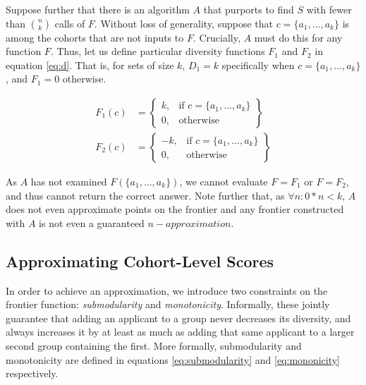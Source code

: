Suppose further that there is an algorithm $A$ that purports to find $S$ with fewer than $n \choose k$ calls of $F$. Without loss of generality, suppose that $c = \{ a_1, ..., a_k \}$ is among the cohorts that are not inputs to $F$. Crucially, $A$ must do this for any function $F$. Thus, let us define particular diversity functions $F_1$ and $F_2$ in equation \ref{eq:d}. That is, for sets of size $k$, $D_1 = k$ specifically when $c = \{ a_1, ..., a_k \}$, and $F_1 = 0$ otherwise.

\begin{equation}
    \label{eq:d}
    \begin{split}
        F_1(c) &=
        \left\{
            \begin{array}{lr}
                k, & \text{if } c = \{ a_1, ..., a_k \}\\
                0, & \text{otherwise }
            \end{array}
        \right\} \\
        F_2(c) &=
        \left\{
            \begin{array}{lr}
                -k, & \text{if } c = \{ a_1, ..., a_k \}\\
                0, & \text{otherwise }
            \end{array}
        \right\}
    \end{split}
\end{equation}

As $A$ has not examined $F(\{ a_1, ..., a_k \})$, we cannot evaluate $F=F_1$ or $F=F_2$, and thus cannot return the correct answer. Note further that, as $\forall n : 0*n < k$, $A$ does not even approximate points on the frontier and any frontier constructed with $A$ is not even a guaranteed $n-approximation$.

\subsection{Approximating Cohort-Level Scores}

In order to achieve an approximation, we introduce two constraints on the frontier function: \textit{submodularity} and \textit{monotonicity}. Informally, these jointly guarantee that adding an applicant to a group never decreases its diversity, and always increases it by at least as much as adding that same applicant to a larger second group containing the first. More formally, submodularity and monotonicity are defined in equations \ref{eq:submodularity} and \ref{eq:mononicity} respectively.

